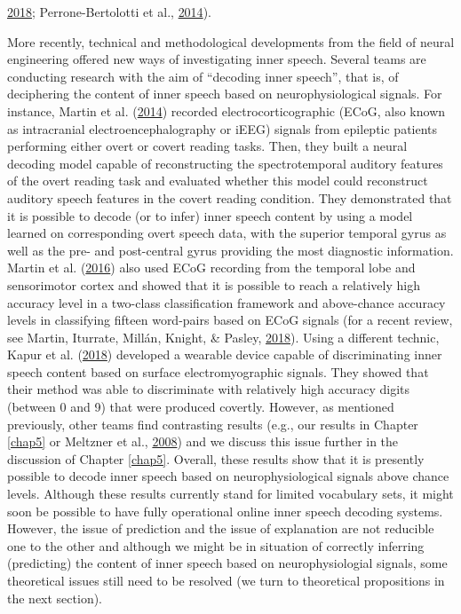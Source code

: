\documentclass[a4paper,12pt,twoside,openright,oldfontcommands,final]{memoir}
\begin{document}
\protect\hyperlink{ref-loevenbruck_cognitive_2018}{2018}; Perrone-Bertolotti et al., \protect\hyperlink{ref-Perrone-Bertolotti2014}{2014}).

More recently, technical and methodological developments from the field of neural engineering offered new ways of investigating inner speech. Several teams are conducting research with the aim of \enquote{decoding inner speech}, that is, of deciphering the content of inner speech based on neurophysiological signals. For instance, Martin et al. (\protect\hyperlink{ref-martin_decoding_2014}{2014}) recorded electrocorticographic (ECoG, also known as intracranial electroencephalography or iEEG) signals from epileptic patients performing either overt or covert reading tasks. Then, they built a neural decoding model capable of reconstructing the spectrotemporal auditory features of the overt reading task and evaluated whether this model could reconstruct auditory speech features in the covert reading condition. They demonstrated that it is possible to decode (or to infer) inner speech content by using a model learned on corresponding overt speech data, with the superior temporal gyrus as well as the pre- and post-central gyrus providing the most diagnostic information. Martin et al. (\protect\hyperlink{ref-martin_word_2016}{2016}) also used ECoG recording from the temporal lobe and sensorimotor cortex and showed that it is possible to reach a relatively high accuracy level in a two-class classification framework and above-chance accuracy levels in classifying fifteen word-pairs based on ECoG signals (for a recent review, see Martin, Iturrate, Millán, Knight, \& Pasley, \protect\hyperlink{ref-martin_decoding_2018}{2018}). Using a different technic, Kapur et al. (\protect\hyperlink{ref-kapur_alterego_2018}{2018}) developed a wearable device capable of discriminating inner speech content based on surface electromyographic signals. They showed that their method was able to discriminate with relatively high accuracy digits (between 0 and 9) that were produced covertly. However, as mentioned previously, other teams find contrasting results (e.g., our results in Chapter \ref{chap5} or Meltzner et al., \protect\hyperlink{ref-meltzner_speech_2008}{2008}) and we discuss this issue further in the discussion of Chapter \ref{chap5}. Overall, these results show that it is presently possible to decode inner speech based on neurophysiological signals above chance levels. Although these results currently stand for limited vocabulary sets, it might soon be possible to have fully operational online inner speech decoding systems. However, the issue of prediction and the issue of explanation are not reducible one to the other and although we might be in situation of correctly inferring (predicting) the content of inner speech based on neurophysiologial signals, some theoretical issues still need to be resolved (we turn to theoretical propositions in the next section).
\end{document}
